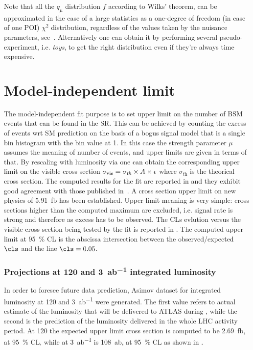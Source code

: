 Note that all the $q_\mu$ distribution $f$ according to Wilks' theorem, can be approximated in the case of a large statistics as a one-degree of freedom (in case of one POI) $\chi^2$ distribution, regardless of the values taken by the nuisance parameters, see~\cite[\!]{Cowan}. Alternatively one can obtain it by performing several pseudo-experiment, i.e. \emph{toys}, to get the right distribution even if they're always time expensive.

\section{Model-independent limit}
The model-independent fit purpose is to set upper limit on the number of BSM events that can be found in the SR. This can be achieved by counting the excess of events wrt SM prediction on the basis of a bogus signal model that is a single bin histogram with the bin value at 1. In this case the strength parameter $\mu$ assumes the meaning of number of events, and upper limits are given in terms of that. By rescaling with luminosity via \Eqn{\ref{eqn:Nevents}} one can obtain the corresponding upper limit on the visible cross section $\sigma_\textup{vis}=\sigma_\textit{th}\times A\times\epsilon$ where $\sigma_\textit{th}$ is the theorical cross section. The computed results for the fit are reported in \Tab{\ref{table.results.exclxsec.pval.upperlimit.SR}} and they exhibit good agreement with those published in~\cite{paperMP}. A cross section upper limit on new physics of \SI{5.91}{fb} has been established. Upper limit meaning is very simple: cross sections higher than the computed maximum are excluded, i.e. signal rate is strong and therefore as excess has to be observed. The CLs evlution versus the visible cross section being tested by the fit is reported in \Fig{\ref{fig:cls}}. The computed upper limit at \SI{95}{\percent} CL is the abscissa intersection between the observed/expected $\cls$ and the line $\cls=0.05$.




\subsubsection{Projections at \SI{120}{\ifb} and \SI{3}{ab^{-1}} integrated luminosity}
 In order to foresee future data prediction, Asimov dataset for integrated luminosity at \SI{120}{\ifb} and \SI{3}{ab^{-1}} were generated. The first value refers to actual estimate of the luminosity that will be delivered to ATLAS during \RunTwo, while the second is the prediction of the luminosity delivered in the whole LHC activity period. At \SI{120}{\ifb} the expected upper limit cross section is computed to be \SI{2.69}{fb}, at \SI{95}{\percent} CL, while at \SI{3}{ab^{-1}} is \SI{108}{ab}, at \SI{95}{\percent} CL as shown in \Tab{\ref{table.results.exclxsec.pval.upperlimit.SR}}.


